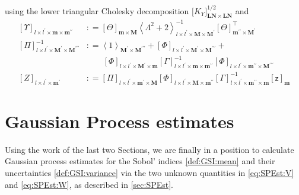 \documentclass[preprint,12pt]{elsarticle}
\newcommand*{\M}[1]{\ensuremath{#1}\xspace}
\newcommand*{\x}{\times}
\newcommand*{\mi}[1]{\mathbf{#1}}
\newcommand*{\rv}[1]{\mathsf{#1}}
\newcommand*{\te}[2][]{\left\lbrack{#2}\right\rbrack_{#1}}
\newcommand*{\tte}[2][]{\lbrack{#2}\rbrack_{#1}}
\newcommand*{\diag}[2][]{\left\langle{#2}\right\rangle_{#1}}
\newcommand*{\deq}{\M{\mathrel{\mathop:}=}}
\begin{document}
            using the lower triangular Cholesky decomposition $\tte[\mi{LN}\x\mi{LN}]{K_{Y}}^{1/2}$ and
            \begin{equation*}
                \begin{aligned}
                    \te[l\x l^{\prime}\x\mi{m}\x\mi{m^{\prime\prime}}]{\Upsilon} &\deq 
                    \te[\mi{m}\x\mi{M}]{\Theta}
                    \diag[l\x l^{\prime}\x\mi{M}\x\mi{M^{\prime}}]{\Lambda^{2}+2}^{-1} \te[\mi{m^{\prime\prime}}\x\mi{M^{\prime}}]{\Theta}^{\intercal} \\
                    \te[l\x l^{\prime}\x \mi{M^{\prime}}\x\mi{M^{\prime\prime\prime}}]{\Pi}^{-1} &\deq 
                    \diag[\mi{M^{\prime}}\x\mi{M^{\prime\prime\prime}}]{1} + \te[l\x l^{\prime}\x \mi{M^{\prime}}\x\mi{M^{\prime\prime\prime}}]{\Phi} + \\
                    &\phantom{\deq}\ \te[l\x l^{\prime}\x\mi{M^{\prime}\x\mi{m}}]{\Phi}
                    \te[l\x l^{\prime}\x\mi{m}\x\mi{m^{\prime\prime}}]{\Gamma}^{-1} \te[l\x l^{\prime}\x\mi{m^{\prime\prime}}\x\mi{M^{\prime\prime\prime}}]{\Phi} \\
                    \te[l\x l^{\prime}\x \mi{m^{\prime}}]{Z} &\deq 
                    \te[l\x l^{\prime}\x \mi{m^{\prime}}\x\mi{M}]{\Pi}
                    \te[l\x l^{\prime}\x\mi{M}\x\mi{m^{\prime\prime}}]{\Phi}
                    \te[l\x l^{\prime}\x\mi{m^{\prime\prime}}\x\mi{m}]{\Gamma}^{-1}
                    \te[\mi{m}]{\rv{z}}
                \end{aligned}
            \end{equation*}


\section{Gaussian Process estimates}\label{sec:GPEst}
    Using the work of the last two Sections, we are finally in a position to calculate Gaussian process estimates for the Sobol' indices \cref{def:GSI:mean} and their uncertainties \cref{def:GSI:variance} via the two unknown quantities in \cref{eq:SPEst:V} and \cref{eq:SPEst:W}, as described in \cref{sec:SPEst}.
\end{document}
